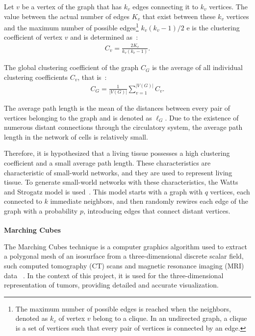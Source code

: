 \documentclass[a4paper,11pt]{article}
\begin{document}
{Let $v$ be a vertex of the graph that has $k_v$ edges connecting it to $k_v$ vertices. The value between the actual number of edges $K_v$ that exist between these $k_v$ vertices and the maximum number of possible edges\footnote{The maximum number of possible edges is reached when the neighbors, denoted as $k_v$ of vertex $v$ belong to a clique. In an undirected graph, a clique is a set of vertices such that every pair of vertices is connected by an edge.} $k_v(k_v-1)/2$ e is the clustering coefficient of vertex $v$ and is determined as~\cite{7}:
\begin{align}
C_v = \displaystyle\frac{2K_v}{k_v(k_v-1)}. \label{eq-clustering}
\end{align}

The global clustering coefficient of the graph $C_G$ is the average of all individual clustering coefficients $C_v$, that is~\cite{7}:
\begin{align}
C_G = \displaystyle\frac{1}{|V(G)|}\sum _{v=1} ^{|V(G)|} C_v. \label{eq-global-clustering}
\end{align}

The average path length is the mean of the distances between every pair of vertices belonging to the graph and is denoted as $\ell_G$. Due to the existence of numerous distant connections through the circulatory system, the average path length in the network of cells is relatively small.

Therefore, it is hypothesized that a living tissue possesses a high clustering coefficient and a small average path length. These characteristics are characteristic of small-world networks, and they are used to represent living tissue. To generate small-world networks with these characteristics, the Watts and Strogatz model is used~\cite{9}. This model starts with a graph with $q$ vertices, each connected to $k$ immediate neighbors, and then randomly rewires each edge of the graph with a probability $p$, introducing edges that connect distant vertices.\\
\\
\textbf{Marching Cubes}

The Marching Cubes technique is a computer graphics algorithm used to extract a polygonal mesh of an isosurface from a three-dimensional discrete scalar field, such computed tomography (CT) scans and magnetic resonance imaging (MRI) data ~\cite{5}. In the context of this project, it is used for the three-dimensional representation of tumors, providing detailed and accurate visualization.

}
\end{document}
